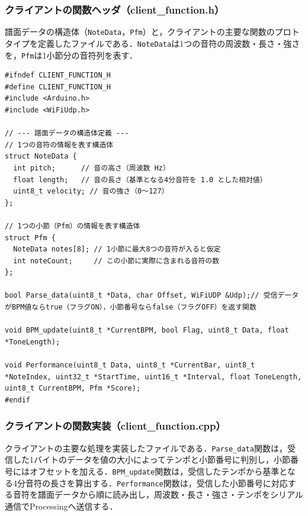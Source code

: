 \subsubsection{クライアントの関数ヘッダ（client\_function.h）}
譜面データの構造体（\texttt{NoteData}，\texttt{Pfm}）と，クライアントの主要な関数のプロトタイプを定義したファイルである．\texttt{NoteData}は1つの音符の周波数・長さ・強さを，\texttt{Pfm}は1小節分の音符列を表す．

\begin{lstlisting}
#ifndef CLIENT_FUNCTION_H
#define CLIENT_FUNCTION_H
#include <Arduino.h>
#include <WiFiUdp.h>

// --- 譜面データの構造体定義 ---
// 1つの音符の情報を表す構造体
struct NoteData {
  int pitch;      // 音の高さ（周波数 Hz）
  float length;   // 音の長さ（基準となる4分音符を 1.0 とした相対値）
  uint8_t velocity; // 音の強さ（0〜127）
};

// 1つの小節（Pfm）の情報を表す構造体
struct Pfm {
  NoteData notes[8]; // 1小節に最大8つの音符が入ると仮定
  int noteCount;     // この小節に実際に含まれる音符の数
};

bool Parse_data(uint8_t *Data, char Offset, WiFiUDP &Udp);// 受信データがBPM値ならtrue（フラグON），小節番号ならfalse（フラグOFF）を返す関数

void BPM_update(uint8_t *CurrentBPM, bool Flag, uint8_t Data, float *ToneLength);

void Performance(uint8_t Data, uint8_t *CurrentBar, uint8_t *NoteIndex, uint32_t *StartTime, uint16_t *Interval, float ToneLength, uint8_t CurrentBPM, Pfm *Score);
#endif

\end{lstlisting}

\subsubsection{クライアントの関数実装（client\_function.cpp）}
クライアントの主要な処理を実装したファイルである．\texttt{Parse\_data}関数は，受信した1バイトのデータを値の大小によってテンポと小節番号に判別し，小節番号にはオフセットを加える．\texttt{BPM\_update}関数は，受信したテンポから基準となる4分音符の長さを算出する．\texttt{Performance}関数は，受信した小節番号に対応する音符を譜面データから順に読み出し，周波数・長さ・強さ・テンポをシリアル通信でProcessingへ送信する．

